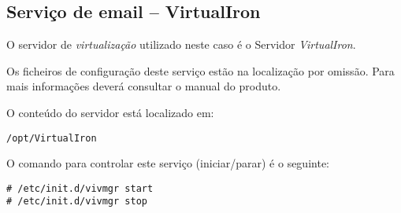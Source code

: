 \subsection{Serviço de email -- VirtualIron}

O servidor de \emph{virtualização} utilizado neste caso é o Servidor \emph{VirtualIron}.

Os ficheiros de configuração deste serviço estão na localização por omissão. Para mais informações deverá consultar o manual do produto.

O conteúdo do servidor está localizado em:

\begin{Verbatim}[commandchars=\\\{\}]
/opt/VirtualIron
\end{Verbatim}

O comando para controlar este serviço (iniciar/parar) é o seguinte:

\begin{Verbatim}[commandchars=\\\{\}]
# /etc/init.d/vivmgr start
# /etc/init.d/vivmgr stop
\end{Verbatim}

